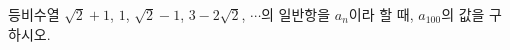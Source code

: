 등비수열 $\sqrt{2}+1$, $1$, $\sqrt{2}-1$, $3-2\sqrt{2}$, $\cdots$의 일반항을 $a_n$이라 할 때, $a_{100}$의 값을 구하시오.
